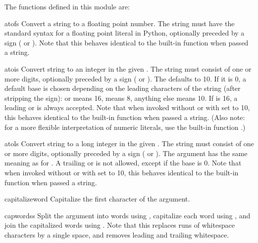 The functions defined in this module are:


\begin{funcdesc}{atof}{s}
Convert a string to a floating point number.  The string must have
the standard syntax for a floating point literal in Python, optionally
preceded by a sign (\samp{+} or \samp{-}).  Note that this behaves
identical to the built-in function
 when passed a string.
\end{funcdesc}

\begin{funcdesc}{atoi}{s}
Convert string  to an integer in the given .  The
string must consist of one or more digits, optionally preceded by a
sign (\samp{+} or \samp{-}).  The  defaults to 10.  If it is
0, a default base is chosen depending on the leading characters of the
string (after stripping the sign):  or  means 16,
 means 8, anything else means 10.  If  is 16, a
leading  or  is always accepted.  Note that when
invoked without  or with  set to 10, this behaves
identical to the built-in function  when passed a string.
(Also note: for a more flexible interpretation of numeric literals,
use the built-in function .)
\end{funcdesc}

\begin{funcdesc}{atol}{s}
Convert string  to a long integer in the given .  The 
string must consist of one or more digits, optionally preceded by a
sign (\samp{+} or \samp{-}).  The  argument has the same
meaning as for .  A trailing  or  is
not allowed, except if the base is 0.  Note that when invoked without
 or with  set to 10, this behaves identical to the
built-in function  when passed a
string.
\end{funcdesc}

\begin{funcdesc}{capitalize}{word}
Capitalize the first character of the argument.
\end{funcdesc}

\begin{funcdesc}{capwords}{s}
Split the argument into words using , capitalize
each word using , and join the capitalized
words using .  Note that this replaces runs of
whitespace characters by a single space, and removes leading and
trailing whitespace.
\end{funcdesc}

